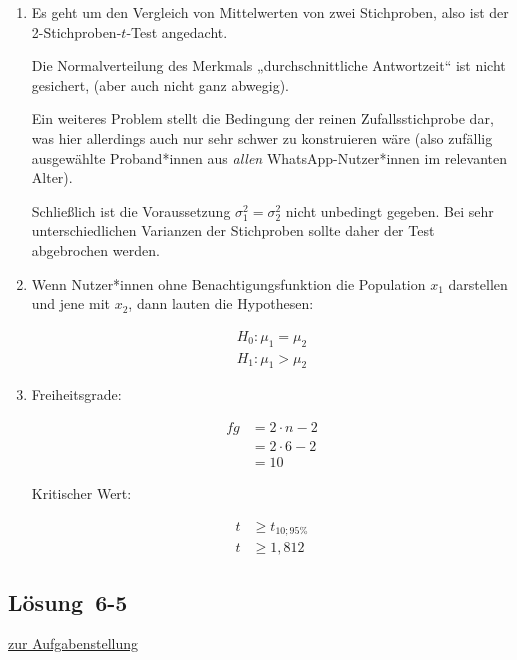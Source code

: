 \documentclass[
  11pt,
  ngerman,
  a4paper,
]{report}
\begin{document}
\begin{enumerate}
\def\labelenumi{\alph{enumi})}
\item
  Es geht um den Vergleich von Mittelwerten von zwei Stichproben, also ist der 2-Stichproben-\(t\)-Test angedacht.

  Die Normalverteilung des Merkmals „durchschnittliche Antwortzeit`` ist nicht gesichert, (aber auch nicht ganz abwegig).

  Ein weiteres Problem stellt die Bedingung der reinen Zufallsstichprobe dar, was hier allerdings auch nur sehr schwer zu konstruieren wäre (also zufällig ausgewählte Proband*innen aus \emph{allen} WhatsApp-Nutzer*innen im relevanten Alter).

  Schließlich ist die Voraussetzung \(\sigma^2_1=\sigma^2_2\) nicht unbedingt gegeben. Bei sehr unterschiedlichen Varianzen der Stichproben sollte daher der Test abgebrochen werden.
\item
  Wenn Nutzer*innen ohne Benachtigungsfunktion die Population \(x_1\) darstellen und jene mit \(x_2\), dann lauten die Hypothesen:

  \[\begin{aligned}
   H_0: \mu_1=\mu_2\\
   H_1: \mu_1 > \mu_2
   \end{aligned}\]
\item
  Freiheitsgrade:

  \[\begin{aligned}
   \mathit{fg}&=2\cdot n-2\\
   &=2\cdot 6-2\\
   &=10
   \end{aligned}\]

  Kritischer Wert:

  \[\begin{aligned}
   t &\geq t_{10;95\%}\\
   t &\geq 1{,}812
   \end{aligned}\]
\end{enumerate}

\hypertarget{loesung-6-5}{%
\subsection{Lösung~6-5}\label{loesung-6-5}}

\protect\hyperlink{aufgabe-6-5}{zur Aufgabenstellung}
\end{document}

